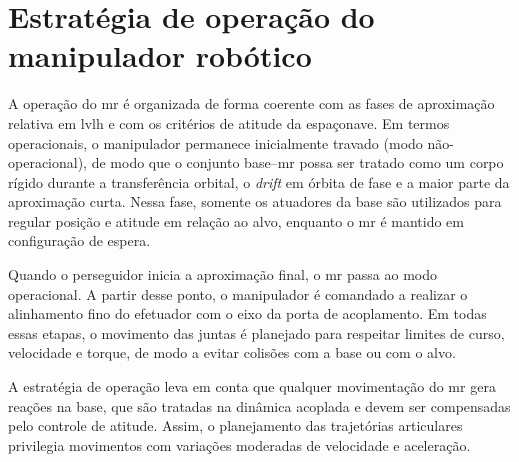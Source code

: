 \section{Estratégia de operação do manipulador robótico}
\label{sec:estrategia_operacao_MR}

A operação do \gls{mr} é organizada de forma coerente com as fases de aproximação relativa em \gls{lvlh} e com os critérios de atitude da espaçonave.
Em termos operacionais, o manipulador permanece inicialmente travado (modo não-operacional), de modo que o conjunto base--\gls{mr} possa ser tratado como um corpo rígido durante a transferência orbital, o \textit{drift} em órbita de fase e a maior parte da aproximação curta.
Nessa fase, somente os atuadores da base são utilizados para regular posição e atitude em relação ao alvo, enquanto o \gls{mr} é mantido em configuração de espera.

Quando o perseguidor inicia a aproximação final, o \gls{mr} passa ao modo operacional.
A partir desse ponto, o manipulador é comandado a realizar o alinhamento fino do efetuador com o eixo da porta de acoplamento.
Em todas essas etapas, o movimento das juntas é planejado para respeitar limites de curso, velocidade e torque, de modo a evitar colisões com a base ou com o alvo.

A estratégia de operação leva em conta que qualquer movimentação do \gls{mr} gera reações na base, que são tratadas na dinâmica acoplada e devem ser compensadas pelo controle de atitude.
Assim, o planejamento das trajetórias articulares privilegia movimentos com variações moderadas de velocidade e aceleração.